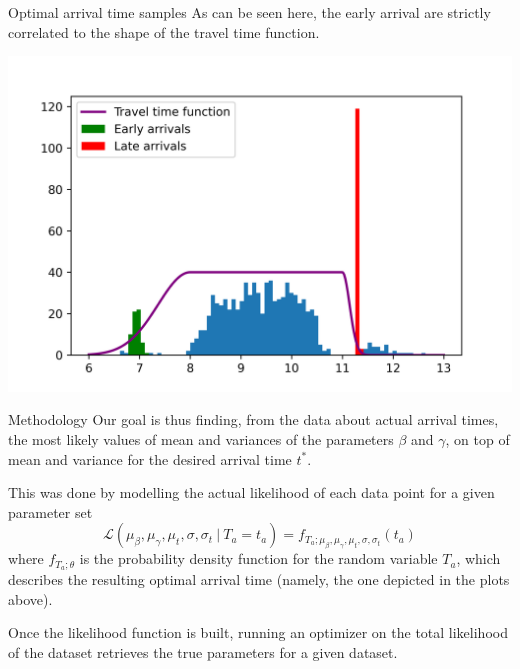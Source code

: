 \documentclass{beamer}
\begin{document}
\begin{frame}{Optimal arrival time samples}
  As can be seen here, the early arrival are strictly correlated to the shape of the travel time function.
  \begin{center}
    \includegraphics[width=\textwidth]{t_as_bins_tt}
  \end{center}
\end{frame}

\begin{frame}{Methodology}
  Our goal is thus finding, from the data about actual arrival times, the most likely values of mean and variances of the parameters \(\beta\) and \(\gamma\), on top of mean and variance for the desired arrival time \(t^*\).

  This was done by modelling the actual likelihood of each data point for a given parameter set
  \begin{equation*}
    \mathcal{L}(\mu_\beta, \mu_\gamma, \mu_t, \sigma, \sigma_t\ \vert\ T_a = t_a) =
  f_{T_a; \mu_\beta, \mu_\gamma, \mu_t, \sigma, \sigma_t}(t_a)
  \end{equation*}
  where \(f_{T_a; \theta}\) is the probability density function for the random variable \(T_a\),
  which describes the resulting optimal arrival time (namely, the one depicted in the plots above).
  
  Once the likelihood function is built, running an optimizer on the total likelihood of the dataset retrieves the true parameters for a given dataset.
\end{frame}
\end{document}
